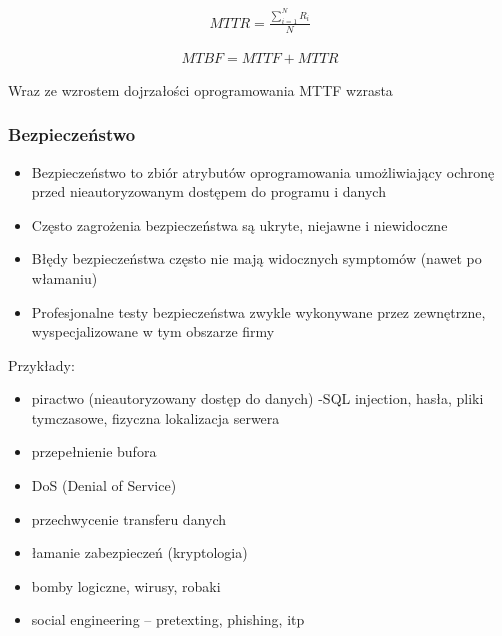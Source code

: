 \documentclass[../main.tex]{subfiles}
\begin{document}
    \begin{align*}
        MTTR = \frac{\sum_{i=1}^{N} R_i}{N}
    \end{align*}

    \begin{align*}
        MTBF = MTTF + MTTR
    \end{align*}

    Wraz ze wzrostem dojrzałości oprogramowania MTTF wzrasta


    \subsubsection{Bezpieczeństwo}
    \begin{itemize}
        \item Bezpieczeństwo to zbiór atrybutów oprogramowania umożliwiający ochronę przed nieautoryzowanym
        dostępem do programu i danych
        \item Często zagrożenia bezpieczeństwa są ukryte, niejawne i niewidoczne
        \item Błędy bezpieczeństwa często nie mają widocznych symptomów (nawet po włamaniu)
        \item Profesjonalne testy bezpieczeństwa zwykle wykonywane przez zewnętrzne, wyspecjalizowane w tym obszarze firmy
    \end{itemize}

    Przykłady:
    \begin{itemize}
        \item piractwo (nieautoryzowany dostęp do danych) -SQL injection, hasła, pliki tymczasowe, fizyczna lokalizacja serwera
        \item przepełnienie bufora
        \item DoS (Denial of Service)
        \item przechwycenie transferu danych
        \item łamanie zabezpieczeń (kryptologia)
        \item bomby logiczne, wirusy, robaki
        \item social engineering – pretexting, phishing, itp
    \end{itemize}
\end{document}
